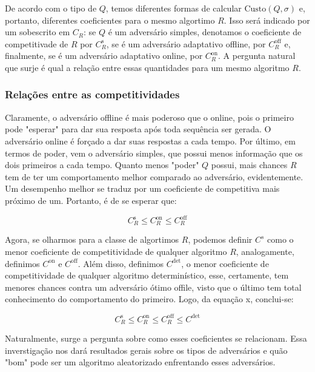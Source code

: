 \documentclass[a4paper,oneside,reqno,12pt]{amsart}
\begin{document}
De acordo com o tipo de $Q$, temos diferentes formas de calcular $\text{Custo}(Q, \sigma)$ e, portanto, diferentes coeficientes para o mesmo algortimo $R$. Isso será indicado por um sobescrito em $C_R$: se $Q$ é um adversário simples, denotamos o coeficiente de competitivade de $R$ por $C_R^{\text{s}}$, se é um adversário adaptativo offline, por $C_R^{\text{off}}$ e, finalmente, se é um adversário adaptativo online, por $C_R^{\text{on}}$. A pergunta natural que surje é qual a relação entre essas quantidades para um mesmo algoritmo $R$.

\subsubsection{Relações entre as competitividades}

Claramente, o adversário offline é mais poderoso que o online, pois o primeiro pode "esperar" para dar sua resposta após toda sequência ser gerada. O adversário online é forçado a dar suas respostas a cada tempo. Por último, em termos de poder, vem o adversário simples, que possui menos informação que os dois primeiros a cada tempo. Quanto menos "poder" $Q$ possui, mais chances $R$ tem de ter um comportamento melhor comparado ao adversário, evidentemente. Um desempenho melhor se traduz por um coeficiente de competitiva mais próximo de um. Portanto, é de se esperar que:

\begin{equation}
  C_R^{\text{s}} \leqslant C_R^{\text{on}} \leqslant C_R^{\text{off}}
\end{equation}

Agora, se olharmos para a classe de algortimos $R$, podemos definir $C^{s}$ como o menor coeficiente de competitividade de qualquer algoritmo $R$, analogamente, definimos $C^\text{{on}}$ e $C^\text{{off}}$. Além disso, definimos $C^{\text{det}}$, o menor coeficiente de competitividade de qualquer algoritmo determinístico, esse, certamente, tem menores chances contra um adversário ótimo offile, visto que o último tem total conhecimento do comportamento do primeiro. Logo, da equação x, conclui-se:

\begin{equation}
  C_R^{\text{s}} \leqslant C_R^{\text{on}} \leqslant C_R^{\text{off}} \leqslant C^{\text{det}}
\end{equation}

Naturalmente, surge a pergunta sobre como esses coeficientes se relacionam. Essa inverstigação nos dará resultados gerais sobre os tipos de adversários e quão "bom" pode ser um algoritmo aleatorizado enfrentando esses adversários.
\end{document}
